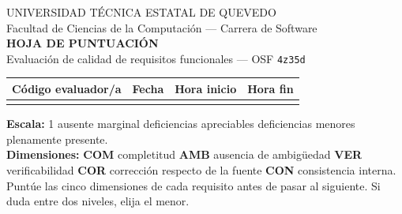 \documentclass[11pt,a4paper]{article}
\begin{document}
\begin{center}
{\footnotesize UNIVERSIDAD TÉCNICA ESTATAL DE QUEVEDO\\
Facultad de Ciencias de la Computación --- Carrera de Software}\\[8pt]
{\Large\bfseries\color{uteqverde} HOJA DE PUNTUACIÓN}\\[3pt]
{\footnotesize Evaluación de calidad de requisitos funcionales --- OSF \texttt{4z35d}}
\end{center}

\vspace{4pt}

\renewcommand{\arraystretch}{1.3}
\begin{center}
\begin{tabular}{L{3.2cm} L{5.5cm} L{2.6cm} L{4.2cm}}
\toprule
{}
\textbf{Código evaluador/a} & \textbf{Fecha} & \textbf{Hora inicio} & \textbf{Hora fin} \\
\midrule
\rule{0pt}{4ex} & & & \\
\bottomrule
\end{tabular}
\end{center}

\begin{tcolorbox}[colback=grisclaro,colframe=uteqverde,boxrule=0.6pt,arc=2pt,left=4pt,right=4pt,top=3pt,bottom=3pt]
\footnotesize
\textbf{Escala:} 1 ausente \quad\textbar{} marginal \quad\textbar{} deficiencias apreciables \quad\textbar{} deficiencias menores
\quad\textbar{} plenamente presente.\\
\textbf{Dimensiones:} \textbf{COM} completitud \quad\textbar\quad
\textbf{AMB} ausencia de ambigüedad \quad\textbar\quad
\textbf{VER} verificabilidad \quad\textbar\quad
\textbf{COR} corrección respecto de la fuente \quad\textbar\quad
\textbf{CON} consistencia interna.\\
Puntúe las cinco dimensiones de cada requisito antes de pasar al siguiente. Si
duda entre dos niveles, elija el menor.
\end{tcolorbox}

\vspace{4pt}
\end{document}
